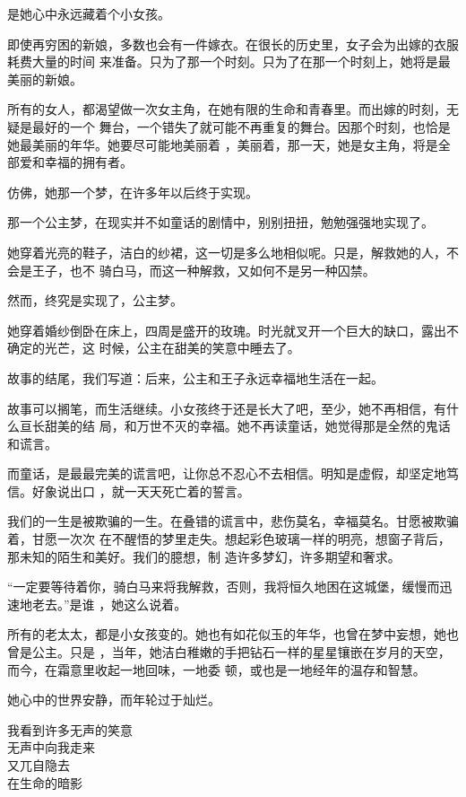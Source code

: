 \documentclass[12pt,a4paper]{article}
\begin{document}
		是她心中永远藏着个小女孩。

		即使再穷困的新娘，多数也会有一件嫁衣。在很长的历史里，女子会为出嫁的衣服耗费大量的时间
	来准备。只为了那一个时刻。只为了在那一个时刻上，她将是最美丽的新娘。

		所有的女人，都渴望做一次女主角，在她有限的生命和青春里。而出嫁的时刻，无疑是最好的一个
	舞台，一个错失了就可能不再重复的舞台。因那个时刻，也恰是她最美丽的年华。她要尽可能地美丽着
	，美丽着，那一天，她是女主角，将是全部爱和幸福的拥有者。

		仿佛，她那一个梦，在许多年以后终于实现。

		那一个公主梦，在现实并不如童话的剧情中，别别扭扭，勉勉强强地实现了。

		她穿着光亮的鞋子，洁白的纱裙，这一切是多么地相似呢。只是，解救她的人，不会是王子，也不
	骑白马，而这一种解救，又如何不是另一种囚禁。

		然而，终究是实现了，公主梦。

		她穿着婚纱倒卧在床上，四周是盛开的玫瑰。时光就叉开一个巨大的缺口，露出不确定的光芒，这
	时候，公主在甜美的笑意中睡去了。

		故事的结尾，我们写道：后来，公主和王子永远幸福地生活在一起。

		故事可以搁笔，而生活继续。小女孩终于还是长大了吧，至少，她不再相信，有什么亘长甜美的结
	局，和万世不灭的幸福。她不再读童话，她觉得那是全然的鬼话和谎言。

		而童话，是最最完美的谎言吧，让你总不忍心不去相信。明知是虚假，却坚定地笃信。好象说出口
	，就一天天死亡着的誓言。

		我们的一生是被欺骗的一生。在叠错的谎言中，悲伤莫名，幸福莫名。甘愿被欺骗着，甘愿一次次
	在不醒悟的梦里走失。想起彩色玻璃一样的明亮，想窗子背后，那未知的陌生和美好。我们的臆想，制
	造许多梦幻，许多期望和奢求。

		“一定要等待着你，骑白马来将我解救，否则，我将恒久地困在这城堡，缓慢而迅速地老去。”是谁
	，她这么说着。

		所有的老太太，都是小女孩变的。她也有如花似玉的年华，也曾在梦中妄想，她也曾是公主。只是
	，当年，她洁白稚嫩的手把钻石一样的星星镶嵌在岁月的天空，而今，在霜意里收起一地回味，一地委
	顿，或也是一地经年的温存和智慧。

		她心中的世界安静，而年轮过于灿烂。

	\endwriting



		\longpoem{}{}{}
		我看到许多无声的笑意 \\
		无声中向我走来 \\
		又兀自隐去 \\
		在生命的暗影
		\endlongpoem
\end{document}
